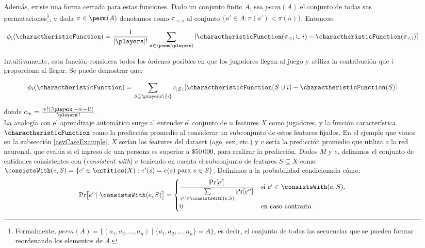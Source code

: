 Además, existe una forma cerrada para estas funciones. Dado un conjunto finito $A$, sea $perm(A)$ el conjunto de todas sus permutaciones\footnote{Formalmente, $perm(A) = \{(a_1, a_2, \dots, a_n) \mid \{a_1, a_2, \dots, a_n\} = A\}$, es decir, el conjunto de todas las secuencias que se pueden formar reordenando los elementos de $A$.}, y dada $\pi \in \perm(A)$ denotamos como $\pi_{<a}$ al conjunto $\{a' \in A : \pi(a') < \pi(a)\}$. Entonces:

\begin{align}\label{eq:shapley_values_by_perm}
    \phi_i(\charactheristicFunction) = \frac{1}{|\players|!} \sum_{\pi \in \perm(\players)} \left[\charactheristicFunction(\pi_{<i} \cup {i}) - \charactheristicFunction(\pi_{<i})\right]
\end{align}

Intuitivamente, esta función considera todos los órdenes posibles en que los jugadores llegan al juego y utiliza la contribución que $i$ proporciona al llegar. Se puede demostrar que:

\begin{align*}
    \phi_i(\charactheristicFunction) = \sum_{S \subseteq \players \setminus \{i\}} c_{|S|}\left[\charactheristicFunction(S \cup {i}) - \charactheristicFunction(S)\right]
\end{align*}

donde $c_m = \frac{m! (|\players|-m-1!)}{|\players|!}$.\\

La analogía con el aprendizaje automático surge al entender el conjunto de \(n\) features \(X\) como jugadores, y la función característica \(\charactheristicFunction\) como la predicción promedio al considerar un subconjunto de estos features fijados. En el ejemplo que vimos en la subsección \ref{asvCaseExample}, $X$ serían los features del dataset (age, sex, etc.) y $v$ sería la predicción promedio que utiliza a la  red neuronal, que evalúa si el ingreso de una persona es superior a \$50\,000, para realizar la predicción. Dados \(M\) y \(e\), definimos el conjunto de entidades consistentes con (\textit{consistent with}) \(e\) teniendo en cuenta el subconjunto de features \(S \subseteq X\) como \(\consistsWith(e, S) = \{e' \in \entities(X) : e'(s) = e(s) \text{ para } s \in S\}\). Definimos a la probabilidad condicionada cómo: %
\[
\Pr\bigl[e' \mid \consistsWith(e,S)\bigr] =
\begin{cases}
\displaystyle \frac{\Pr[e']}{\sum\limits_{e'' \in \consistsWith(e,S)} \Pr[e'']} & \text{si } e' \in \consistsWith(e,S), \\
0 & \text{en caso contrario}.
\end{cases}
\]

